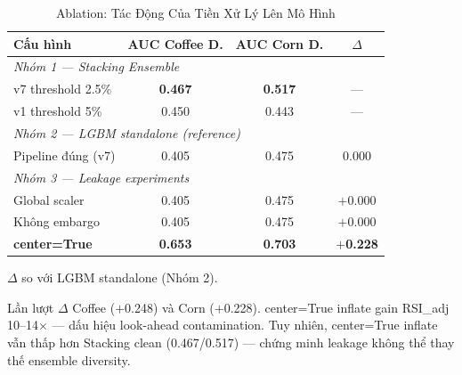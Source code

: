 \documentclass[conference]{IEEEtran}
\begin{document}
\begin{table}[t]
\caption{Ablation: Tác Động Của Tiền Xử Lý Lên Mô Hình}
\label{tab:ablation}
\centering
\begin{threeparttable}
\begin{tabular}{@{}lccc@{}}
\toprule
\textbf{Cấu hình} & \textbf{AUC Coffee D.} & \textbf{AUC Corn D.} & \textbf{$\Delta$\tnote{a}} \\
\midrule
\multicolumn{4}{l}{\textit{Nhóm 1 — Stacking Ensemble}} \\
v7 threshold 2.5\%  & \textbf{0.467} & \textbf{0.517} & --- \\
v1 threshold 5\%    & 0.450          & 0.443          & --- \\
\midrule
\multicolumn{4}{l}{\textit{Nhóm 2 — LGBM standalone (reference)}} \\
Pipeline đúng (v7)  & 0.405          & 0.475          & 0.000 \\
\midrule
\multicolumn{4}{l}{\textit{Nhóm 3 — Leakage experiments}} \\
Global scaler       & 0.405 & 0.475 & $+$0.000 \\
Không embargo       & 0.405 & 0.475 & $+$0.000 \\
\textbf{center=True}& \textbf{0.653} & \textbf{0.703} & $+$\textbf{0.228}\tnote{b} \\
\bottomrule
\end{tabular}
\begin{tablenotes}
\footnotesize
\item[a] $\Delta$ so với LGBM standalone (Nhóm 2).
\item[b] Lần lượt $\Delta$ Coffee ($+$0.248) và Corn ($+$0.228). center=True
inflate gain RSI\_adj 10--14$\times$ — dấu hiệu look-ahead contamination.
Tuy nhiên, center=True inflate vẫn thấp hơn Stacking clean (0.467/0.517)
— chứng minh leakage không thể thay thế ensemble diversity.
\end{tablenotes}
\end{threeparttable}
\end{table}
\end{document}
